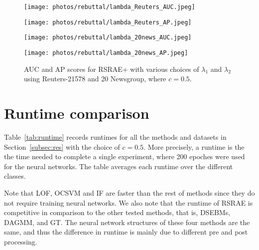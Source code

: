 \documentclass{article} \usepackage{iclr2020_conference,times}
\def\Secref#1{Section~\ref{#1}}
\begin{document}
\begin{figure}

 
\centering
\begin{minipage}[t]{0.48\textwidth}
\centering
\texttt{[image: photos/rebuttal/lambda\_Reuters\_AUC.jpeg]}
\end{minipage}
\begin{minipage}[t]{0.48\textwidth}
\centering
\texttt{[image: photos/rebuttal/lambda\_Reuters\_AP.jpeg]}
\end{minipage}


\centering
\begin{minipage}[t]{0.48\textwidth}
\centering
\texttt{[image: photos/rebuttal/lambda\_20news\_AUC.jpeg]}
\end{minipage}
\begin{minipage}[t]{0.48\textwidth}
\centering
\texttt{[image: photos/rebuttal/lambda\_20news\_AP.jpeg]}
\end{minipage}

\caption{AUC and AP scores for RSRAE+ with various choices of $\lambda_1$ and $\lambda_2$ using Reuters-21578 and 20 Newsgroup, where $c=0.5$.
}
\label{fig:hyperparameters2}
\end{figure}

\newpage
\section{Runtime comparison}
\label{sec:runtime}
Table~\ref{tab:runtime} records runtimes for all the methods and datasets in \Secref{subsec:res} with the choice of $c=0.5$. More precisely, a runtime is the the time needed to complete a single experiment, where 200 epoches were used for the neural networks. The table averages each runtime over the different classes.



Note that LOF, OCSVM and IF are faster than the rest of methods since they do not require training neural networks. 
We also note that the runtime of RSRAE is competitive in comparison to the other tested methods, that is, 
DSEBMs, DAGMM, and GT. The neural network structures of these four methods are the same, and thus the difference in runtime is mainly due to different pre and post processing. 
\end{document}
